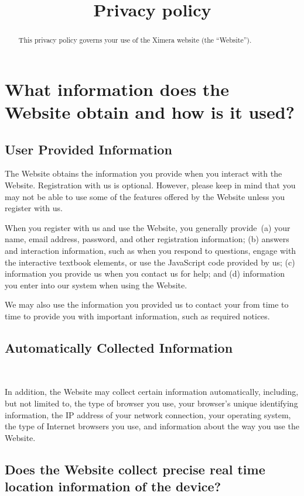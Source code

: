 \documentclass{ximera}
\title{Privacy policy}
\begin{document}
\begin{abstract}
  This privacy policy governs your use of the Ximera website (the
  ``Website'').
\end{abstract}
\maketitle

\section{What information does the Website obtain and how is it used?}

\subsection{User Provided Information}

The Website obtains the information you provide when you interact with
the Website. Registration with us is optional. However, please keep in
mind that you may not be able to use some of the features offered by
the Website unless you register with us.

When you register with us and use the Website, you generally
provide~(a) your name, email address, password, and other registration
information; (b) answers and interaction information, such as when you
respond to questions, engage with the interactive textbook elements,
or use the JavaScript code provided by us; (c) information you provide
us when you contact us for help; and (d) information you enter into
our system when using the Website.

We may also use the information you provided us to contact your from
time to time to provide you with important information, such as
required notices.

\subsection{Automatically Collected Information}~

In addition, the Website may collect certain information
automatically, including, but not limited to, the type of browser you
use, your browser's unique identifying information, the IP address of
your network connection, your operating system, the type of Internet
browsers you use, and information about the way you use the Website.

\subsection{Does the Website collect precise real time location
  information of the
  device?}
\end{document}
